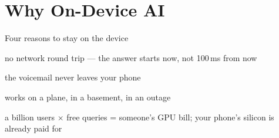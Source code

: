 
\section[Why on-device]{Why On-Device AI}


\begin{frame}{Four reasons to stay on the device}
  \vspace{0.6em}
  \raggedright
  \begin{description}[<+->][Availability]\itemsep7pt
    \item[Latency] no network round trip --- the answer starts now, not
      100\,ms from now
    \item[Privacy] the voicemail never leaves your phone
    \item[Availability] works on a plane, in a basement, in an outage
    \item[Cost] a billion users $\times$ free queries = someone's GPU bill;
      your phone's silicon is already paid for
  \end{description}

  \vspace{0.8em}
\end{frame}

